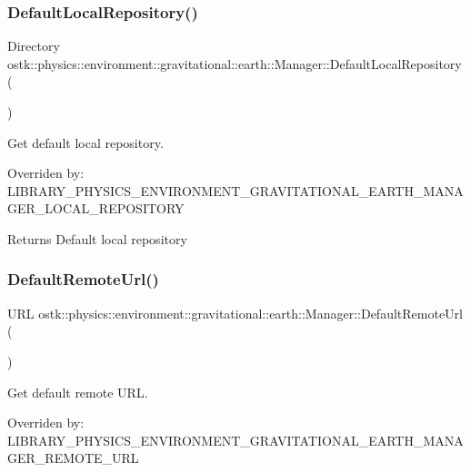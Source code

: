 \subsubsection{\texorpdfstring{Default\+Local\+Repository()}{DefaultLocalRepository()}}
{\footnotesize\ttfamily Directory ostk\+::physics\+::environment\+::gravitational\+::earth\+::\+Manager\+::\+Default\+Local\+Repository (\begin{DoxyParamCaption}{ }\end{DoxyParamCaption})\hspace{0.3cm}{\ttfamily [static]}}



Get default local repository. 

Overriden by\+: L\+I\+B\+R\+A\+R\+Y\+\_\+\+P\+H\+Y\+S\+I\+C\+S\+\_\+\+E\+N\+V\+I\+R\+O\+N\+M\+E\+N\+T\+\_\+\+G\+R\+A\+V\+I\+T\+A\+T\+I\+O\+N\+A\+L\+\_\+\+E\+A\+R\+T\+H\+\_\+\+M\+A\+N\+A\+G\+E\+R\+\_\+\+L\+O\+C\+A\+L\+\_\+\+R\+E\+P\+O\+S\+I\+T\+O\+RY

\begin{DoxyReturn}{Returns}
Default local repository 
\end{DoxyReturn}
\mbox{\label{classostk_1_1physics_1_1environment_1_1gravitational_1_1earth_1_1_manager_aa5a7e062dba707faaf9da092e011f23d}} 
\subsubsection{\texorpdfstring{Default\+Remote\+Url()}{DefaultRemoteUrl()}}
{\footnotesize\ttfamily U\+RL ostk\+::physics\+::environment\+::gravitational\+::earth\+::\+Manager\+::\+Default\+Remote\+Url (\begin{DoxyParamCaption}{ }\end{DoxyParamCaption})\hspace{0.3cm}{\ttfamily [static]}}



Get default remote U\+RL. 

Overriden by\+: L\+I\+B\+R\+A\+R\+Y\+\_\+\+P\+H\+Y\+S\+I\+C\+S\+\_\+\+E\+N\+V\+I\+R\+O\+N\+M\+E\+N\+T\+\_\+\+G\+R\+A\+V\+I\+T\+A\+T\+I\+O\+N\+A\+L\+\_\+\+E\+A\+R\+T\+H\+\_\+\+M\+A\+N\+A\+G\+E\+R\+\_\+\+R\+E\+M\+O\+T\+E\+\_\+\+U\+RL

